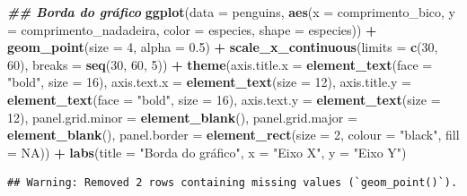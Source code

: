 \documentclass[
]{article}
\newenvironment{Shaded}{\begin{snugshade}}{\end{snugshade}}
\newcommand{\AttributeTok}[1]{\textcolor[rgb]{0.13,0.29,0.53}{#1}}
\newcommand{\ConstantTok}[1]{\textcolor[rgb]{0.56,0.35,0.01}{#1}}
\newcommand{\DecValTok}[1]{\textcolor[rgb]{0.00,0.00,0.81}{#1}}
\newcommand{\DocumentationTok}[1]{\textcolor[rgb]{0.56,0.35,0.01}{\textbf{\textit{#1}}}}
\newcommand{\FloatTok}[1]{\textcolor[rgb]{0.00,0.00,0.81}{#1}}
\newcommand{\FunctionTok}[1]{\textcolor[rgb]{0.13,0.29,0.53}{\textbf{#1}}}
\newcommand{\NormalTok}[1]{#1}
\newcommand{\SpecialCharTok}[1]{\textcolor[rgb]{0.81,0.36,0.00}{\textbf{#1}}}
\newcommand{\StringTok}[1]{\textcolor[rgb]{0.31,0.60,0.02}{#1}}
\begin{document}
\begin{Shaded}
\begin{Highlighting}[]
\DocumentationTok{\#\# Borda do gráfico}
\FunctionTok{ggplot}\NormalTok{(}\AttributeTok{data =}\NormalTok{ penguins, }
       \FunctionTok{aes}\NormalTok{(}\AttributeTok{x =}\NormalTok{ comprimento\_bico, }\AttributeTok{y =}\NormalTok{ comprimento\_nadadeira,}
           \AttributeTok{color =}\NormalTok{ especies, }\AttributeTok{shape =}\NormalTok{ especies)) }\SpecialCharTok{+}
    \FunctionTok{geom\_point}\NormalTok{(}\AttributeTok{size =} \DecValTok{4}\NormalTok{, }\AttributeTok{alpha =} \FloatTok{0.5}\NormalTok{) }\SpecialCharTok{+}
    \FunctionTok{scale\_x\_continuous}\NormalTok{(}\AttributeTok{limits =} \FunctionTok{c}\NormalTok{(}\DecValTok{30}\NormalTok{, }\DecValTok{60}\NormalTok{), }\AttributeTok{breaks =} \FunctionTok{seq}\NormalTok{(}\DecValTok{30}\NormalTok{, }\DecValTok{60}\NormalTok{, }\DecValTok{5}\NormalTok{)) }\SpecialCharTok{+}
    \FunctionTok{theme}\NormalTok{(}\AttributeTok{axis.title.x =} \FunctionTok{element\_text}\NormalTok{(}\AttributeTok{face =} \StringTok{"bold"}\NormalTok{, }\AttributeTok{size =} \DecValTok{16}\NormalTok{),}
          \AttributeTok{axis.text.x =} \FunctionTok{element\_text}\NormalTok{(}\AttributeTok{size =} \DecValTok{12}\NormalTok{),}
          \AttributeTok{axis.title.y =} \FunctionTok{element\_text}\NormalTok{(}\AttributeTok{face =} \StringTok{"bold"}\NormalTok{, }\AttributeTok{size =} \DecValTok{16}\NormalTok{),}
          \AttributeTok{axis.text.y =} \FunctionTok{element\_text}\NormalTok{(}\AttributeTok{size =} \DecValTok{12}\NormalTok{),}
          \AttributeTok{panel.grid.minor =} \FunctionTok{element\_blank}\NormalTok{(),}
          \AttributeTok{panel.grid.major =} \FunctionTok{element\_blank}\NormalTok{(),}
          \AttributeTok{panel.border =} \FunctionTok{element\_rect}\NormalTok{(}\AttributeTok{size =} \DecValTok{2}\NormalTok{, }\AttributeTok{colour =} \StringTok{"black"}\NormalTok{, }\AttributeTok{fill =} \ConstantTok{NA}\NormalTok{)) }\SpecialCharTok{+}
    \FunctionTok{labs}\NormalTok{(}\AttributeTok{title =} \StringTok{"Borda do gráfico"}\NormalTok{, }\AttributeTok{x =} \StringTok{"Eixo X"}\NormalTok{, }\AttributeTok{y =} \StringTok{"Eixo Y"}\NormalTok{)}
\end{Highlighting}
\end{Shaded}

\begin{verbatim}
## Warning: Removed 2 rows containing missing values (`geom_point()`).
\end{verbatim}
\end{document}
